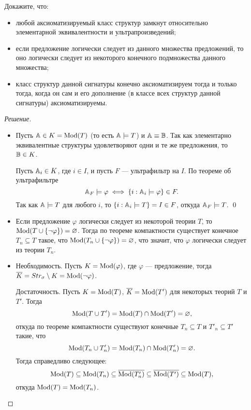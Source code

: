     \begin{problem}[3]
        Докажите, что:
        \begin{itemize}
            \item любой аксиоматизируемый класс структур замкнут относительно элементарной эквивалентности и ультрапроизведений;
            \item если предложение логически следует из данного множества предложений, то оно логически следует из некоторого конечного подмножества данного множества;
            \item класс структур данной сигнатуры конечно аксиоматизируем тогда и только тогда, когда он сам и его дополнение (в классе всех структур данной сигнатуры) аксиоматизируемы.
        \end{itemize}
    \end{problem}
    \begin{proof}[Решение]
        \begin{itemize}
            \item Пусть \(\mathbb{A} \in K = \operatorname{Mod}(T)\) (то есть \(\mathbb{A} \models T\)) и \(\mathbb{A} \equiv \mathbb{B}\). Так как элементарно эквивалентные структуры удовлетворяют одни и те же предложения, то \(\mathbb{B} \in K\).
            
            Пусть \(\mathbb{A}_i \in K\), где \(i \in I\), и пусть \(F\) --- ультрафильтр на \(I\). По теореме об ультрафильтре \[
            \mathbb{A}_F \models \varphi \iff \{i : \mathbb{A}_i \models \varphi\} \in F.
            \]
            Так как \(\mathbb{A} \models T\) для любого \(i\), то \(\{i : \mathbb{A}_i \models T\} = I \in F\), откуда \(\mathbb{A}_F \models T\). \qed
            
            \item Если предложение \(\varphi\) логически следует из некоторой теории \(T\), то \(\operatorname{Mod}(T \cup \{\lnot \varphi\}) = \varnothing\). Тогда по теореме компактности существует конечное \(T_n \subseteq T\) такое, что \(\operatorname{Mod}(T_n \cup \{\lnot \varphi\}) = \varnothing\), что значит, что \(\varphi\) логически следует из теории \(T_n\).
            \item Необходимость. Пусть \(K = \operatorname{Mod}(\varphi)\), где \(\varphi\) --- предложение, тогда \(\overline{K} = Str_\sigma \setminus K = \operatorname{Mod}(\lnot \varphi)\).
            
            Достаточность. Пусть \(K = \operatorname{Mod}(T)\), \(\overline{K}= \operatorname{Mod}(T')\) для некоторых теорий \(T\) и \(T'\). Тогда \[
                \operatorname{Mod}(T \cup T') = \operatorname{Mod}(T) \cap \operatorname{Mod}(T') = \varnothing,
            \]
            откуда по теореме компактности существуют конечные \(T_n \subseteq T\) и \(T'_n \subseteq T'\) такие, что \[
                \operatorname{Mod}(T_n \cup T'_n) = \operatorname{Mod}(T_n) \cap \operatorname{Mod}(T'_n) = \varnothing.
            \]
            Тогда справедливо следующее: \[
                \operatorname{Mod}(T) \subseteq \operatorname{Mod}(T_n) \subseteq \overline{\operatorname{Mod}(T'_n)} \subseteq \overline{\operatorname{Mod}(T')} \subseteq \operatorname{Mod}(T),
            \]
            откуда \(\operatorname{Mod}(T) = \operatorname{Mod}(T_n)\).
        \end{itemize}
    \end{proof}
